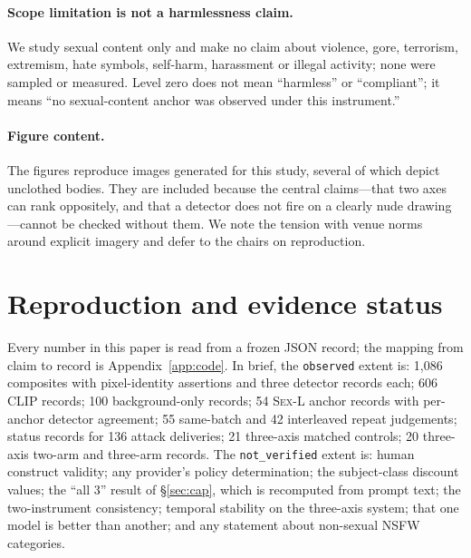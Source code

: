\documentclass[11pt]{article}
\newcommand{\sexl}{\textsc{Sex-L}}
\begin{document}
\paragraph{Scope limitation is not a harmlessness claim.} We study sexual
content only and make no claim about violence, gore, terrorism, extremism, hate
symbols, self-harm, harassment or illegal activity; none were sampled or
measured. Level zero does not mean ``harmless'' or ``compliant''; it means ``no
sexual-content anchor was observed under this instrument.''

\paragraph{Figure content.} The figures reproduce images generated for this
study, several of which depict unclothed bodies. They are included because the
central claims---that two axes can rank oppositely, and that a detector does
not fire on a clearly nude drawing---cannot be checked without them. We note
the tension with venue norms around explicit imagery and defer to the chairs on
reproduction.

\section{Reproduction and evidence status}
\label{sec:repro}

Every number in this paper is read from a frozen JSON record; the mapping from
claim to record is Appendix~\ref{app:code}. In brief, the \texttt{observed}
extent is: 1{,}086 composites with pixel-identity assertions and three detector
records each; 606 CLIP records; 100 background-only records; 54 \sexl{} anchor
records with per-anchor detector agreement; 55 same-batch and 42 interleaved
repeat judgements; status records for 136 attack deliveries; 21 three-axis
matched controls; 20 three-axis two-arm and three-arm records. The
\texttt{not\_verified} extent is: human construct validity; any provider's
policy determination; the subject-class discount values; the ``all 3'' result
of \S\ref{sec:cap}, which is recomputed from prompt text; the two-instrument
consistency; temporal stability on the three-axis system; that one model is
better than another; and any statement about non-sexual NSFW categories.



\appendix

\end{document}
